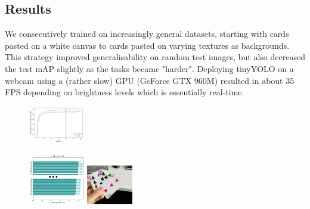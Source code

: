 \documentclass[a0,landscape]{a0poster}
\begin{document}
\begin{multicols}{3}



\section*{Results}


We consecutively trained on increasingly general datasets, starting with cards pasted on a white canvas to cards pasted on varying textures as backgrounds. This strategy improved generalisability on random test images, but also decreased the test mAP slightly as the tasks became "harder". Deploying tinyYOLO on a webcam using a (rather slow) GPU (GeForce GTX 960M) resulted in about 35 FPS depending on brightness levels which is essentially real-time.
\begin{figure}

    \includegraphics[width=0.22\textwidth]{traindev}



    \includegraphics[width=0.22\textwidth]{mAP}
\hspace*{2cm}\includegraphics[width=0.18\textwidth]{ex}


\end{figure}
\end{multicols}
\end{document}
